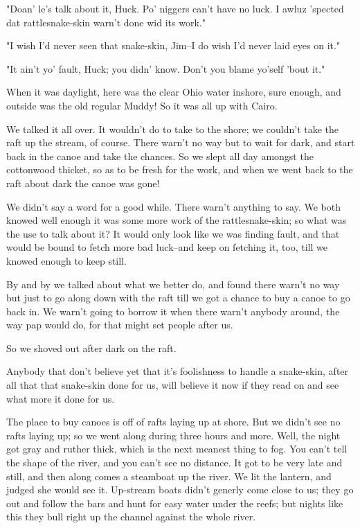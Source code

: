 "Doan' le's talk about it, Huck.  Po' niggers can't have no luck.  I
awluz 'spected dat rattlesnake-skin warn't done wid its work."

"I wish I'd never seen that snake-skin, Jim--I do wish I'd never laid
eyes on it."

"It ain't yo' fault, Huck; you didn' know.  Don't you blame yo'self 'bout
it."

When it was daylight, here was the clear Ohio water inshore, sure enough,
and outside was the old regular Muddy!  So it was all up with Cairo.

We talked it all over.  It wouldn't do to take to the shore; we couldn't
take the raft up the stream, of course.  There warn't no way but to wait
for dark, and start back in the canoe and take the chances.  So we slept
all day amongst the cottonwood thicket, so as to be fresh for the work,
and when we went back to the raft about dark the canoe was gone!

We didn't say a word for a good while.  There warn't anything to say.  We
both knowed well enough it was some more work of the rattlesnake-skin; so
what was the use to talk about it?  It would only look like we was
finding fault, and that would be bound to fetch more bad luck--and keep
on fetching it, too, till we knowed enough to keep still.

By and by we talked about what we better do, and found there warn't no
way but just to go along down with the raft till we got a chance to buy a
canoe to go back in.  We warn't going to borrow it when there warn't
anybody around, the way pap would do, for that might set people after us.

So we shoved out after dark on the raft.

Anybody that don't believe yet that it's foolishness to handle a
snake-skin, after all that that snake-skin done for us, will believe
it now if they read on and see what more it done for us.

The place to buy canoes is off of rafts laying up at shore.  But we
didn't see no rafts laying up; so we went along during three hours and
more.  Well, the night got gray and ruther thick, which is the next
meanest thing to fog.  You can't tell the shape of the river, and you
can't see no distance. It got to be very late and still, and then along
comes a steamboat up the river.  We lit the lantern, and judged she would
see it.  Up-stream boats didn't generly come close to us; they go out and
follow the bars and hunt for easy water under the reefs; but nights like
this they bull right up the channel against the whole river.

